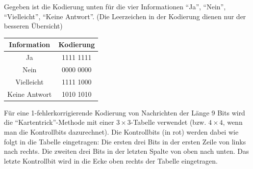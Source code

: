 \begin{questions}
        Gegeben ist die Kodierung unten für die vier Informationen ``Ja'', ``Nein'', ``Vielleicht'', ``Keine Antwort''. (Die Leerzeichen in der Kodierung dienen nur der besseren Übersicht)

        \begin{table}[h!]
            \centering
            \begin{tabular}{c|c}
               Information &   Kodierung  \\ \midrule\midrule
               Ja &  1111 1111\\ \midrule
               Nein &  0000 0000\\  \midrule
               Vielleicht & 1111 1000  \\  \midrule
               Keine Antwort & 1010 1010  \\ 
            \end{tabular}
        \end{table}
        
        \clearpage
        \question
        Für eine 1-fehlerkorrigierende Kodierung von Nachrichten der Länge 9 Bits wird die ``Kartentrick''-Methode mit einer $3\times3$-Tabelle verwendet (bzw. $4\times4$, wenn man die Kontrollbits dazurechnet). Die Kontrollbits (in rot) werden dabei wie folgt in die Tabelle eingetragen: Die ersten drei Bits in der ersten Zeile von links nach rechts. Die zweiten drei Bits in der letzten Spalte von oben nach unten. Das letzte Kontrollbit wird in die Ecke oben rechts der Tabelle eingetragen.


\end{questions}
